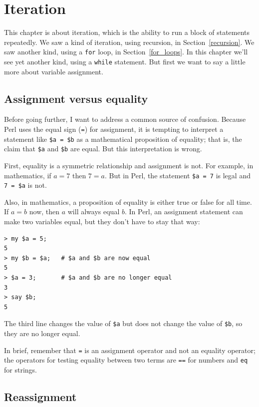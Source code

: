 
\chapter{Iteration}
\label{iteration}

This chapter is about iteration, which is the ability to run
a block of statements repeatedly.  We saw a kind of iteration,
using recursion, in Section~\ref{recursion}.
We saw another kind, using a {\tt for} loop,
in Section~\ref{for_loops}.  In this chapter we'll see yet another
kind, using a {\tt while} statement.
But first we want to say a little more about variable assignment.

\section{Assignment versus equality}

Before going further, I want to address a common source of confusion.
Because Perl uses the equal sign ({\tt =}) for assignment, it is
tempting to interpret a statement like {\tt \$a = \$b} as a
mathematical proposition of equality; that is, the claim that 
{\tt \$a} and {\tt \$b} are equal.  But this interpretation is 
wrong.

First, equality is a symmetric relationship and assignment is not.  For
example, in mathematics, if $a=7$ then $7=a$.  But in Perl, the
statement {\tt \$a = 7} is legal and {\tt 7 = \$a} is not.

Also, in mathematics, a proposition of equality is either true or
false for all time.  If $a=b$ now, then $a$ will always equal $b$.
In Perl, an assignment statement can make two variables equal, but
they don't have to stay that way:

\begin{verbatim}
> my $a = 5;
5
> my $b = $a;   # $a and $b are now equal
5
> $a = 3;       # $a and $b are no longer equal
3
> say $b;
5
\end{verbatim}
%
The third line changes the value of {\tt \$a} but does not 
change the value of {\tt \$b}, so they are no longer equal. 

In brief, remember that {\tt =} is an assignment operator and  
not an equality operator; the operators for testing equality 
between two terms are {\tt ==} for numbers and {\tt eq} for strings.

\section{Reassignment}

